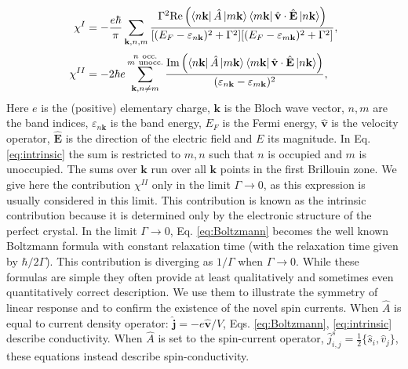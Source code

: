 \documentclass[aps,prl,reprint,amsmath,amssymb,superscriptaddress]{revtex4-1}
\newcommand{\kb}{\mathbf{k}}
\begin{document}
\begin{align}
 \chi^{I} &= -\frac{e\hbar}{\pi}\sum_{\kb, n,m} \frac{\Gamma^2 \text{Re}\left(\Bra{n\kb} \hat{A} \Ket{m\kb} \Bra{m\kb} \hat{\mathbf{v}} \cdot \hat{\mathbf{E}} \Ket{n\kb}\right)}{[(E_F-\varepsilon_{n\kb})^2+\Gamma^2][(E_F-\varepsilon_{m\kb})^2+\Gamma^2]}, \label{eq:Boltzmann}\\
  \chi^{II}  &= -2\hbar e 
  \sum_{\substack{\kb,n \neq m}} ^{\substack{ \\ n\ \text{occ.}\\ m\ \text{unocc.}}}
  \frac{\text{Im}\left(\Bra{n\kb}\hat{A}\Ket{m\kb}\Bra{m\kb}\hat{\mathbf{v}}\cdot \hat{\mathbf{E}}\Ket{n\kb}\right)}{(\varepsilon_{n\kb} - \varepsilon_{m\kb})^2},\label{eq:intrinsic}
\end{align}
Here $e$ is the (positive) elementary charge, $\kb$ is the Bloch wave vector, $n,m$ are the band indices, $\varepsilon_{n\kb}$ is the band energy, $E_F$ is the Fermi energy, $\hat{\mathbf{v}}$ is the velocity operator, $\hat{\mathbf{E}}$ is the direction of the electric field and $E$ its magnitude. In Eq. \eqref{eq:intrinsic} the sum is restricted to $m,n$ such that $n$ is occupied and $m$ is unoccupied. The sums over $\kb$ run over all $\kb$ points in the first Brillouin zone. We give here the contribution $\chi^{II}$  only in the limit $\Gamma \rightarrow 0$, as this expression is usually considered in this limit. This contribution is known as the intrinsic contribution because it is determined only by the electronic structure of the perfect crystal. In the limit $\Gamma \rightarrow 0$, Eq. \eqref{eq:Boltzmann} becomes the well known Boltzmann formula with constant relaxation time (with the relaxation time given by $\hbar/2\Gamma$). This contribution is diverging as $1/\Gamma$ when $\Gamma \rightarrow 0$.  While these formulas are simple they often provide at least qualitatively and sometimes even quantitatively correct description. We use them to illustrate the symmetry of linear response and to confirm the existence of the novel spin currents. When $\hat{A}$ is equal to current density operator: $\hat{\mathbf{j}} = -e\hat{\mathbf{v}}/V$, Eqs. \eqref{eq:Boltzmann}, \eqref{eq:intrinsic} describe conductivity. When $\hat{A}$ is set to the spin-current operator, $\hat{j}^s_{i,j} = \frac{1}{2}\{\hat{s}_i,\hat{v}_j\}$, these equations instead describe spin-conductivity.
\end{document}
